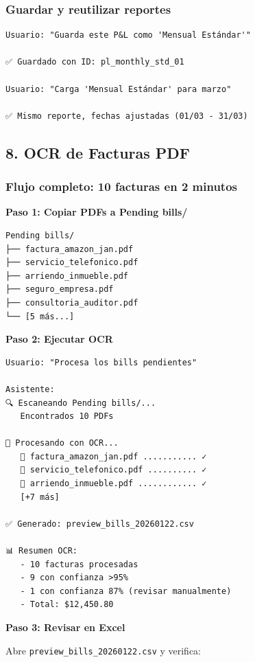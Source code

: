 \documentclass[12pt,oneside]{article}
\begin{document}
\subsubsection{Guardar y reutilizar reportes}

\begin{verbatim}
Usuario: "Guarda este P&L como 'Mensual Estándar'"

✅ Guardado con ID: pl_monthly_std_01

Usuario: "Carga 'Mensual Estándar' para marzo"

✅ Mismo reporte, fechas ajustadas (01/03 - 31/03)
\end{verbatim}

\subsection{8. OCR de Facturas PDF}

\subsubsection{Flujo completo: 10 facturas en 2 minutos}

\textbf{Paso 1: Copiar PDFs a Pending bills/}

\begin{verbatim}
Pending bills/
├── factura_amazon_jan.pdf
├── servicio_telefonico.pdf
├── arriendo_inmueble.pdf
├── seguro_empresa.pdf
├── consultoria_auditor.pdf
└── [5 más...]
\end{verbatim}

\textbf{Paso 2: Ejecutar OCR}

\begin{verbatim}
Usuario: "Procesa los bills pendientes"

Asistente:
🔍 Escaneando Pending bills/...
   Encontrados 10 PDFs

🔄 Procesando con OCR...
   📄 factura_amazon_jan.pdf ........... ✓
   📄 servicio_telefonico.pdf .......... ✓
   📄 arriendo_inmueble.pdf ............ ✓
   [+7 más]

✅ Generado: preview_bills_20260122.csv

📊 Resumen OCR:
   - 10 facturas procesadas
   - 9 con confianza >95%
   - 1 con confianza 87% (revisar manualmente)
   - Total: $12,450.80
\end{verbatim}

\textbf{Paso 3: Revisar en Excel}

Abre \texttt{preview\_bills\_20260122.csv} y verifica:
\end{document}
